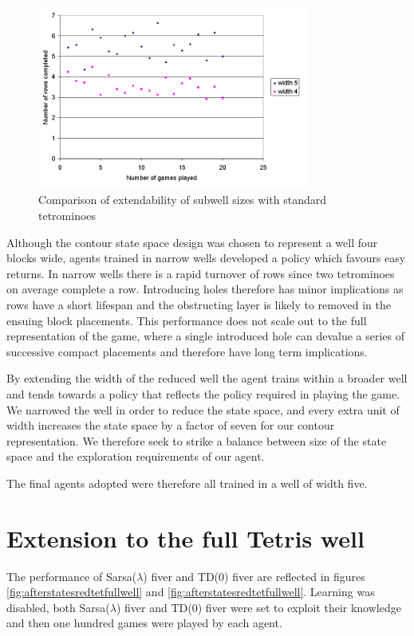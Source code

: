 \documentclass{rucsthesis}
\begin{document}
\begin{figure}[h]
\centering
\includegraphics[width=3.5in]{widthcomparrisonfulltet.png}
\caption{Comparison of extendability of subwell sizes with standard tetrominoes}
\label{fig:widthcomparrisonfulltet}
\end{figure}

Although the contour state space design was chosen to represent a well four blocks wide, agents trained in narrow wells developed a policy which favours easy returns. In narrow wells there is a rapid turnover of rows since two tetrominoes on average complete a row. Introducing holes therefore has minor implications as rows have a short lifespan and the obstructing layer is likely to removed in the ensuing block placements. This performance does not scale out to the full representation of the game, where a single introduced hole can devalue a series of successive compact placements and therefore have long term implications.

By extending the width of the reduced well the agent trains within a broader well and tends towards a policy that reflects the policy required in playing the game. We narrowed the well in order to reduce the state space, and every extra unit of width increases the state space by a factor of seven for our contour representation. We therefore seek to strike a balance between size of the state space and the exploration requirements of our agent.

The final agents adopted were therefore all trained in a well of width five.

\section{Extension to the full Tetris well}

The performance of Sarsa($\lambda$) fiver and TD(0) fiver are reflected in figures \ref{fig:afterstatesredtetfullwell} and \ref{fig:afterstatesredtetfullwell}. Learning was disabled, both Sarsa($\lambda$) fiver and TD(0) fiver were set to exploit their knowledge and then one hundred games were played by each agent. 
\end{document}
